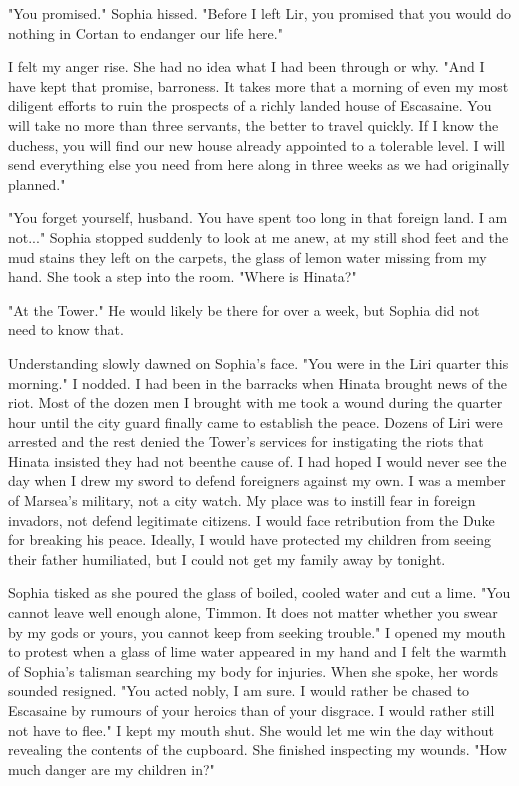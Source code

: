 \documentclass{article}
\begin{document}
"You promised." Sophia hissed. "Before I left Lir, you promised that you would do nothing in Cortan to endanger our life here."

I felt my anger rise. She had no idea what I had been through or why. "And I have kept that promise, barroness. It takes more that a morning of even my most diligent efforts to ruin the prospects of a richly landed house of Escasaine. You will take no more than three servants, the better to travel quickly. If I know the duchess, you will find our new house already appointed to a tolerable level. I will send everything else you need from here along in three weeks as we had originally planned."

"You forget yourself, husband. You have spent too long in that foreign land. I am not..." Sophia stopped suddenly to look at me anew, at my still shod feet and the mud stains they left on the carpets, the glass of lemon water missing from my hand. She took a step into the room. "Where is Hinata?"

"At the Tower." He would likely be there for over a week, but Sophia did not need to know that.

Understanding slowly dawned on Sophia's face. "You were in the Liri quarter this morning." I nodded. I had been in the barracks when Hinata brought news of the riot. Most of the dozen men I brought with me took a wound during the quarter hour until the city guard finally came to establish the peace. Dozens of Liri were arrested and the rest denied the Tower's services for instigating the riots that Hinata insisted they had not beenthe cause of. I had hoped I would never see the day when I drew my sword to defend foreigners against my own. I was a member of Marsea's military, not a city watch. My place was to instill fear in foreign invadors, not defend legitimate citizens. I would face retribution from the Duke for breaking his peace. Ideally, I would have protected my children from seeing their father humiliated, but I could not get my family away by tonight. 

Sophia tisked as she poured the glass of boiled, cooled water and cut a lime. "You cannot leave well enough alone, Timmon. It does not matter whether you swear by my gods or yours, you cannot keep from seeking trouble." I opened my mouth to protest when a glass of lime water appeared in my hand and I felt the warmth of Sophia's talisman searching my body for injuries. When she spoke, her words sounded resigned. "You acted nobly, I am sure. I would rather be chased to Escasaine by rumours of your heroics than of your disgrace. I would rather still not have to flee." I kept my mouth shut. She would let me win the day without revealing the contents of the cupboard. She finished inspecting my wounds. "How much danger are my children in?"
\end{document}
